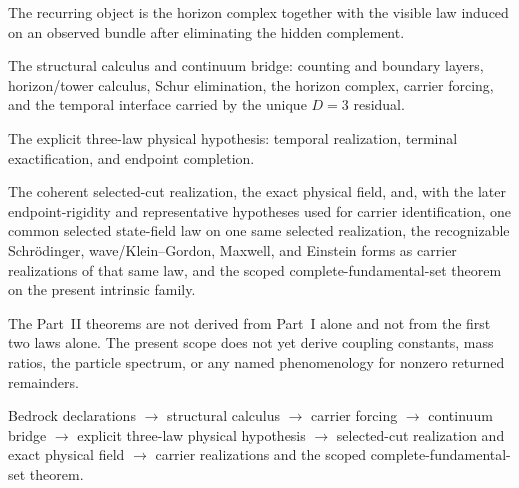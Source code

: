 \documentclass[11pt]{article}
\theoremstyle{definition}
\theoremstyle{remark}
\theoremstyle{definition}
\begin{document}
\begin{tcolorbox}[colback=white, colframe=black!70, title={First-Pass Synopsis}]
\footnotesize
\begin{description}[leftmargin=1.9em, itemsep=0.3em]
\item[Core object.] The recurring object is the horizon complex together with
      the visible law induced on an observed bundle after eliminating the
      hidden complement.
\item[Part~I proves.] The structural calculus and continuum bridge: counting
      and boundary layers, horizon/tower calculus, Schur elimination, the
      horizon complex, carrier forcing, and the temporal interface carried by
      the unique \(D=3\) residual.
\item[Part~II assumes.] The explicit three-law physical hypothesis: temporal
      realization, terminal exactification, and endpoint completion.
\item[Part~II proves.] The coherent selected-cut realization, the exact
      physical field, and, with the later endpoint-rigidity and
      representative hypotheses used for carrier identification, one common
      selected state-field law on one same selected realization, the
      recognizable Schr\"odinger, wave/Klein--Gordon, Maxwell, and Einstein
      forms as carrier realizations of that same law, and the scoped
      complete-fundamental-set theorem on the present intrinsic family.
\item[Not claimed.] The Part~II theorems are not derived from Part~I alone and
      not from the first two laws alone. The present scope does not yet derive
      coupling constants, mass ratios, the particle spectrum, or any named
      phenomenology for nonzero returned remainders.
\item[Dependency spine.] Bedrock declarations \(\to\) structural calculus
      \(\to\) carrier forcing \(\to\) continuum bridge \(\to\) explicit
      three-law physical hypothesis \(\to\) selected-cut realization and exact
      physical field \(\to\) carrier realizations and the scoped
      complete-fundamental-set theorem.
\end{description}
\end{tcolorbox}
\end{document}
